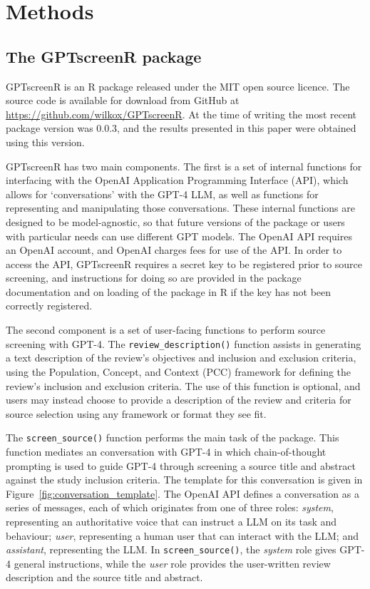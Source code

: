 \documentclass[10pt,a4paper,twocolumn]{article}
\begin{document}
\section{Methods}

\subsection{The GPTscreenR package}

GPTscreenR is an R \cite{R.2023} package released under the MIT open source licence. The source code is available for download from GitHub at \url{https://github.com/wilkox/GPTscreenR}. At the time of writing the most recent package version was 0.0.3, and the results presented in this paper were obtained using this version.

GPTscreenR has two main components. The first is a set of internal functions for interfacing with the OpenAI Application Programming Interface (API), which allows for `conversations' with the GPT-4 LLM, as well as functions for representing and manipulating those conversations. These internal functions are designed to be model-agnostic, so that future versions of the package or users with particular needs can use different GPT models. The OpenAI API requires an OpenAI account, and OpenAI charges fees for use of the API. In order to access the API, GPTscreenR requires a secret key to be registered prior to source screening, and instructions for doing so are provided in the package documentation and on loading of the package in R if the key has not been correctly registered.

The second component is a set of user-facing functions to perform source screening with GPT-4. The \texttt{review\_description()} function assists in generating a text description of the review's objectives and inclusion and exclusion criteria, using the Population, Concept, and Context (PCC) framework \cite{Peters.2020, JBI.2020} for defining the review's inclusion and exclusion criteria. The use of this function is optional, and users may instead choose to provide a description of the review and criteria for source selection using any framework or format they see fit.

The \texttt{screen\_source()} function performs the main task of the package. This function mediates an conversation with GPT-4 in which chain-of-thought prompting \cite{Wei.2022} is used to guide GPT-4 through screening a source title and abstract against the study inclusion criteria. The template for this conversation is given in Figure~\ref{fig:conversation_template}. The OpenAI API defines a conversation as a series of messages, each of which originates from one of three roles: \textit{system}, representing an authoritative voice that can instruct a LLM on its task and behaviour; \textit{user}, representing a human user that can interact with the LLM; and \textit{assistant}, representing the LLM. In \texttt{screen\_source()}, the \textit{system} role gives GPT-4 general instructions, while the \textit{user} role provides the user-written review description and the source title and abstract.
\end{document}
